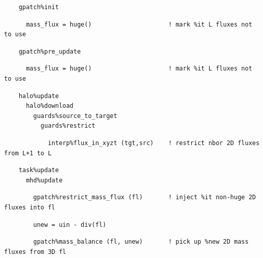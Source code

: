 \documentclass[paper=a4,fontsize=11pt]{scrartcl}
\numberwithin{equation}{section}		%
\numberwithin{figure}{section}			%
\numberwithin{table}{section}				%
\newcommand{\codecolor}{\color{Blue}}
\begin{document}

{\codecolor\small\begin{verbatim}
    gpatch%init
\end{verbatim}}\vspace{-24pt}
{\color{RoyalBlue}\small\begin{verbatim}
      mass_flux = huge()                     ! mark %it L fluxes not to use
\end{verbatim}}\vspace{-24pt}
{\codecolor\small\begin{verbatim}
    gpatch%pre_update
\end{verbatim}}\vspace{-24pt}
{\color{RoyalBlue}\small\begin{verbatim}
      mass_flux = huge()                     ! mark %it L fluxes not to use
\end{verbatim}}\vspace{-24pt}
{\codecolor\small\begin{verbatim}
    halo%update
      halo%download
        guards%source_to_target
          guards%restrict
\end{verbatim}}\vspace{-24pt}
{\color{RoyalBlue}\small\begin{verbatim}
            interp%flux_in_xyzt (tgt,src)    ! restrict nbor 2D fluxes from L+1 to L
\end{verbatim}}\vspace{-24pt}
{\codecolor\small\begin{verbatim}
    task%update
      mhd%update
\end{verbatim}}\vspace{-24pt}
{\color{RoyalBlue}\small\begin{verbatim}
        gpatch%restrict_mass_flux (fl)       ! inject %it non-huge 2D fluxes into fl
\end{verbatim}}\vspace{-24pt}
{\codecolor\small\begin{verbatim}
        unew = uin - div(fl)
\end{verbatim}}\vspace{-24pt}
{\color{RoyalBlue}\small\begin{verbatim}
        gpatch%mass_balance (fl, unew)       ! pick up %new 2D mass fluxes from 3D fl
\end{verbatim}}
\end{document}
